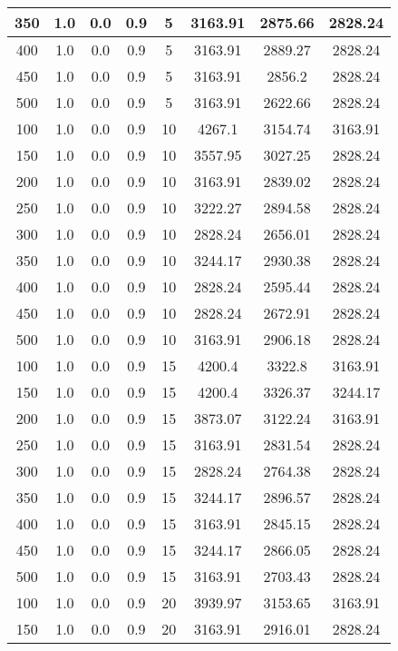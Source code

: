 \documentclass[a4paper, 12pt]{extreport}
\begin{document}
\begin{itemize}
\begin{longtable}{|c|c|c|c|c|c|c|c|}
			350 & 1.0 & 0.0 & 0.9 & 5 & 3163.91 & 2875.66 & 2828.24 \\\hline
			400 & 1.0 & 0.0 & 0.9 & 5 & 3163.91 & 2889.27 & 2828.24 \\\hline
			450 & 1.0 & 0.0 & 0.9 & 5 & 3163.91 & 2856.2 & 2828.24 \\\hline
			500 & 1.0 & 0.0 & 0.9 & 5 & 3163.91 & 2622.66 & 2828.24 \\\hline
			100 & 1.0 & 0.0 & 0.9 & 10 & 4267.1 & 3154.74 & 3163.91 \\\hline
			150 & 1.0 & 0.0 & 0.9 & 10 & 3557.95 & 3027.25 & 2828.24 \\\hline
			200 & 1.0 & 0.0 & 0.9 & 10 & 3163.91 & 2839.02 & 2828.24 \\\hline
			250 & 1.0 & 0.0 & 0.9 & 10 & 3222.27 & 2894.58 & 2828.24 \\\hline
			300 & 1.0 & 0.0 & 0.9 & 10 & 2828.24 & 2656.01 & 2828.24 \\\hline
			350 & 1.0 & 0.0 & 0.9 & 10 & 3244.17 & 2930.38 & 2828.24 \\\hline
			400 & 1.0 & 0.0 & 0.9 & 10 & 2828.24 & 2595.44 & 2828.24 \\\hline
			450 & 1.0 & 0.0 & 0.9 & 10 & 2828.24 & 2672.91 & 2828.24 \\\hline
			500 & 1.0 & 0.0 & 0.9 & 10 & 3163.91 & 2906.18 & 2828.24 \\\hline
			100 & 1.0 & 0.0 & 0.9 & 15 & 4200.4 & 3322.8 & 3163.91 \\\hline
			150 & 1.0 & 0.0 & 0.9 & 15 & 4200.4 & 3326.37 & 3244.17 \\\hline
			200 & 1.0 & 0.0 & 0.9 & 15 & 3873.07 & 3122.24 & 3163.91 \\\hline
			250 & 1.0 & 0.0 & 0.9 & 15 & 3163.91 & 2831.54 & 2828.24 \\\hline
			300 & 1.0 & 0.0 & 0.9 & 15 & 2828.24 & 2764.38 & 2828.24 \\\hline
			350 & 1.0 & 0.0 & 0.9 & 15 & 3244.17 & 2896.57 & 2828.24 \\\hline
			400 & 1.0 & 0.0 & 0.9 & 15 & 3163.91 & 2845.15 & 2828.24 \\\hline
			450 & 1.0 & 0.0 & 0.9 & 15 & 3244.17 & 2866.05 & 2828.24 \\\hline
			500 & 1.0 & 0.0 & 0.9 & 15 & 3163.91 & 2703.43 & 2828.24 \\\hline
			100 & 1.0 & 0.0 & 0.9 & 20 & 3939.97 & 3153.65 & 3163.91 \\\hline
			150 & 1.0 & 0.0 & 0.9 & 20 & 3163.91 & 2916.01 & 2828.24 \\\hline

\end{longtable}
\end{itemize}
\end{document}
